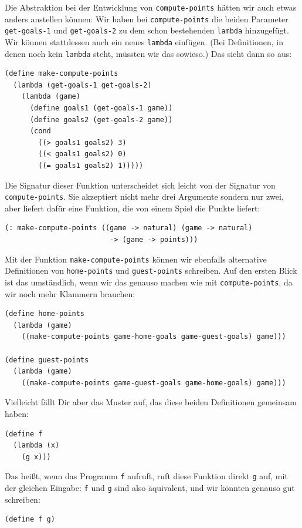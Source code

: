 Die Abstraktion bei der Entwicklung von \lstinline{compute-points}
hätten wir auch etwas anders anstellen können: Wir haben bei
\lstinline{compute-points} die beiden Parameter
\lstinline{get-goals-1} und \lstinline{get-goals-2} zu dem schon
bestehenden \lstinline{lambda} hinzugefügt.  Wir können stattdessen
auch ein neues \lstinline{lambda} einfügen.  (Bei Definitionen, in
denen noch kein \lstinline{lambda} steht, müssten wir das sowieso.)
Das sieht dann so aus:
%
\begin{lstlisting}
(define make-compute-points
  (lambda (get-goals-1 get-goals-2)
    (lambda (game)
      (define goals1 (get-goals-1 game))
      (define goals2 (get-goals-2 game))
      (cond
        ((> goals1 goals2) 3)
        ((< goals1 goals2) 0)
        ((= goals1 goals2) 1)))))
\end{lstlisting}
%
Die Signatur dieser Funktion unterscheidet sich leicht von der
Signatur von \lstinline{compute-points}.  Sie akzeptiert nicht mehr drei
Argumente sondern nur zwei, aber liefert dafür eine Funktion, die von
einem Spiel die Punkte liefert:
%
\begin{lstlisting}
(: make-compute-points ((game -> natural) (game -> natural) 
                         -> (game -> points)))
\end{lstlisting}
%
Mit der Funktion \lstinline{make-compute-points}  können wir ebenfalls alternative Definitionen von
\lstinline{home-points} und \lstinline{guest-points} schreiben.  Auf den ersten Blick ist
das umständlich, wenn wir das genauso machen wie mit
\lstinline{compute-points}, da wir noch mehr Klammern brauchen:
%
\begin{lstlisting}
(define home-points
  (lambda (game)
    ((make-compute-points game-home-goals game-guest-goals) game)))

(define guest-points
  (lambda (game)
    ((make-compute-points game-guest-goals game-home-goals) game)))
\end{lstlisting}
%
Vielleicht fällt Dir aber das Muster auf, das diese beiden
Definitionen gemeinsam haben:
%
\begin{lstlisting}
(define f
  (lambda (x)
    (g x)))
\end{lstlisting}
%
Das heißt, wenn das Programm \lstinline{f} aufruft, ruft diese
Funktion direkt \lstinline{g} auf, mit der gleichen Eingabe:
\lstinline{f} und \lstinline{g} sind also äquivalent, und wir könnten
genauso gut schreiben:
%
\begin{lstlisting}
(define f g)
\end{lstlisting}
